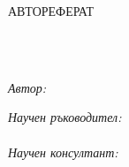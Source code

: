 \frontmatter %

\pagestyle{plain} %


\begin{titlepage}
\begin{center}
\vspace*{.06\textheight}
{\scshape\LARGE \univname\par}\vspace{1.5cm} %
{\scshape\LARGE \compname\par}\vspace{1.5cm} %
\textsc{\Large АВТОРЕФЕРАТ}\\[0.5cm] %

\HRule \\[0.4cm] %
{\huge \bfseries \ttitle\par}\vspace{0.4cm} %
\HRule \\[1.5cm] %
 
\begin{minipage}[t]{0.4\textwidth}
\begin{flushleft} \large
\emph{Автор:}\\
\href{http://senderov.net}{\authorname} %
\end{flushleft}
\end{minipage}
\begin{minipage}[t]{0.4\textwidth}
\begin{flushright} \large
\emph{Научен ръководител:} \\
\href{http://pensoft.net}{\supname} \\ %
\emph{Научен консултант:} \\
\href{http://bultreebank.org/en/our-team/kiril-simov/}{\consname} %

\end{flushright}
\end{minipage}\\[3cm]


\end{center}
\end{titlepage}
